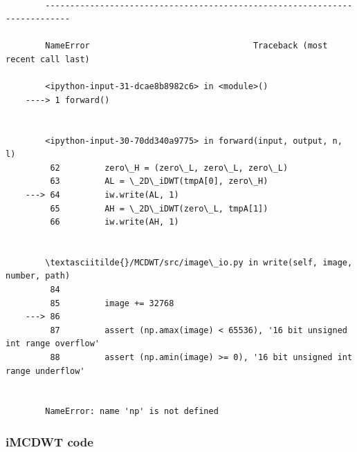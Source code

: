     \begin{Verbatim}[commandchars=\\\{\}]

        ---------------------------------------------------------------------------

        NameError                                 Traceback (most recent call last)

        <ipython-input-31-dcae8b8982c6> in <module>()
    ----> 1 forward()
    

        <ipython-input-30-70dd340a9775> in forward(input, output, n, l)
         62         zero\_H = (zero\_L, zero\_L, zero\_L)
         63         AL = \_2D\_iDWT(tmpA[0], zero\_H)
    ---> 64         iw.write(AL, 1)
         65         AH = \_2D\_iDWT(zero\_L, tmpA[1])
         66         iw.write(AH, 1)


        \textasciitilde{}/MCDWT/src/image\_io.py in write(self, image, number, path)
         84 
         85         image += 32768
    ---> 86 
         87         assert (np.amax(image) < 65536), '16 bit unsigned int range overflow'
         88         assert (np.amin(image) >= 0), '16 bit unsigned int range underflow'


        NameError: name 'np' is not defined

    \end{Verbatim}

    \hypertarget{imcdwt-code}{%
\subsubsection{iMCDWT code}\label{imcdwt-code}}

